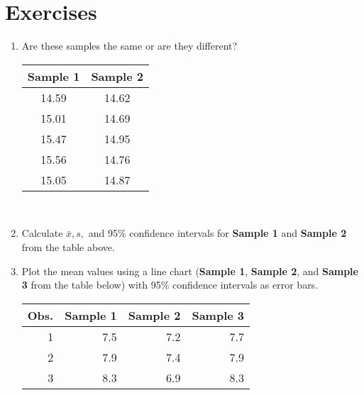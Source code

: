 \section{Exercises}

\begin{enumerate}
\item Are these samples the same or are they different?

\begin{tabular}{|c|c|}
\hline \textbf{Sample 1} & \textbf{Sample 2} \\ 
\hline 14.59 & 14.62 \\ 
\hline 15.01 & 14.69 \\ 
\hline 15.47 & 14.95 \\ 
\hline 15.56 & 14.76 \\ 
\hline 15.05 & 14.87 \\ 
\hline 

\end{tabular}\\
\item Calculate $ \bar{x}, s, $ and 95\% confidence intervals for \textbf{Sample 1} and \textbf{Sample 2} from the table above.
\item Plot the mean values using a line chart (\textbf{Sample 1}, \textbf{Sample 2}, and \textbf{Sample 3} from the table below) with 95\% confidence intervals as error bars.

\begin{tabular}{|r|r|r|r|}
\hline Obs. & \textbf{Sample 1} & \textbf{Sample 2} & \textbf{Sample 3} \\ 
\hline 1 & 7.5 & 7.2 & 7.7 \\ 
\hline 2 & 7.9 & 7.4 & 7.9 \\ 
\hline 3 & 8.3 & 6.9 & 8.3 \\ 
\hline 
\end{tabular} 
 
\end{enumerate}

